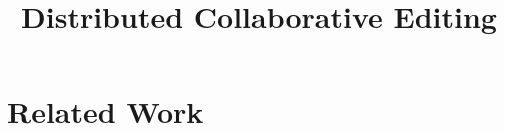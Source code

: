 \documentclass[elsart1p]{elsarticle}
\title{Distributed Collaborative Editing}
\author{}
\date{}
\begin{document}

\maketitle



\section{Related Work}





\raggedright

\clearpage
\end{document}
